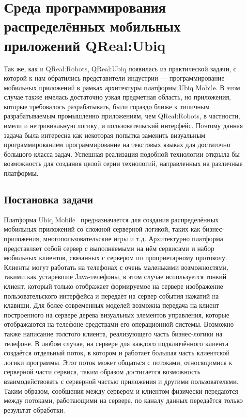 \section{Среда программирования распределённых мобильных приложений QReal:Ubiq}
\label{chapter:qRealUbiq}
Так же, как и QReal:Robots, QReal:Ubiq появилась из практической задачи, с которой к нам 
обратились представители индустрии --- программирование мобильных приложений в рамках архитектуры 
платформы Ubiq Mobile. В этом случае также имелась достаточно узкая предметная область, 
но приложения, которые требовалось разрабатывать, были гораздо ближе к типичным разрабатываемым 
промышленно приложениям, чем QReal:Robots, в частности, имели и нетривиальную логику, и 
пользовательский интерфейс. Поэтому данная задача была интересна как некоторая попытка 
заменить визуальным программированием программирование на текстовых языках для достаточно 
большого класса задач. Успешная реализация подобной технологии открыла бы возможность 
для создания целой серии технологий, направленных на различные платформы.

\subsection{Постановка задачи}
Платформа Ubiq Mobile~\cite{onossovski2009ubiq} предназначается для создания распределённых мобильных приложений со сложной серверной 
логикой, таких как бизнес-приложения, многопользовательские игры и т.д. Архитектурно 
платформа представляет собой сервер с выполняемыми на нём сервисами и набор мобильных 
клиентов, связанных с сервером по проприетарному протоколу. Клиенты могут работать 
на телефонах с очень маленькими возможностями, такими как устаревшие Java-телефоны, 
в этом случае используется тонкий клиент, который только отображает формируемое на 
сервере изображение пользовательского интерфейса и передаёт на сервер события нажатий 
на клавиши. Для более современных моделей возможна передача на клиент построенного 
на сервере дерева визуальных элементов управления, которые отображаются на телефоне 
средствами его операционной системы. Возможно также написание толстого клиента, реализующего 
часть бизнес-логики на телефоне. В любом случае, на сервере для каждого подключённого 
клиента создаётся отдельный поток, в котором и работает большая часть клиентской логики 
программы. Этот поток может общаться с потоками, относящимися к серверной части сервиса, 
таким образом достигается возможность взаимодействовать с серверной частью приложения и другими 
пользователями. Таким образом, сообщения между сервером и клиентом физически передаются 
между потоками, работающими на сервере, по каналу данных передаётся только результат 
обработки.


